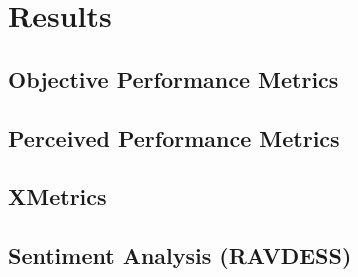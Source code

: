

\section{Results}

\subsection{Objective Performance Metrics}

\subsection{Perceived Performance Metrics}

\subsection{XMetrics}

\subsection{Sentiment Analysis (RAVDESS)}








